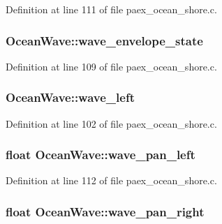 Definition at line 111 of file paex\+\_\+ocean\+\_\+shore.\+c.

\subsubsection[{\texorpdfstring{wave\+\_\+envelope\+\_\+state}{wave_envelope_state}}]{ Ocean\+Wave\+::wave\+\_\+envelope\+\_\+state}\hypertarget{struct_ocean_wave_a9d013e0e64432874f4f24530cfbc247e}{}\label{struct_ocean_wave_a9d013e0e64432874f4f24530cfbc247e}


Definition at line 109 of file paex\+\_\+ocean\+\_\+shore.\+c.

\subsubsection[{\texorpdfstring{wave\+\_\+left}{wave_left}}]{ Ocean\+Wave\+::wave\+\_\+left}\hypertarget{struct_ocean_wave_afa6bba35115a6e2402c375ee02af3521}{}\label{struct_ocean_wave_afa6bba35115a6e2402c375ee02af3521}


Definition at line 102 of file paex\+\_\+ocean\+\_\+shore.\+c.

\subsubsection[{\texorpdfstring{wave\+\_\+pan\+\_\+left}{wave_pan_left}}]{\setlength{\rightskip}{0pt plus 5cm}float Ocean\+Wave\+::wave\+\_\+pan\+\_\+left}\hypertarget{struct_ocean_wave_aa7b309b1765c05b912f425a46e6729d2}{}\label{struct_ocean_wave_aa7b309b1765c05b912f425a46e6729d2}


Definition at line 112 of file paex\+\_\+ocean\+\_\+shore.\+c.

\subsubsection[{\texorpdfstring{wave\+\_\+pan\+\_\+right}{wave_pan_right}}]{\setlength{\rightskip}{0pt plus 5cm}float Ocean\+Wave\+::wave\+\_\+pan\+\_\+right}\hypertarget{struct_ocean_wave_adc20e359cb3a5ba648c756ae143610f2}{}\label{struct_ocean_wave_adc20e359cb3a5ba648c756ae143610f2}


